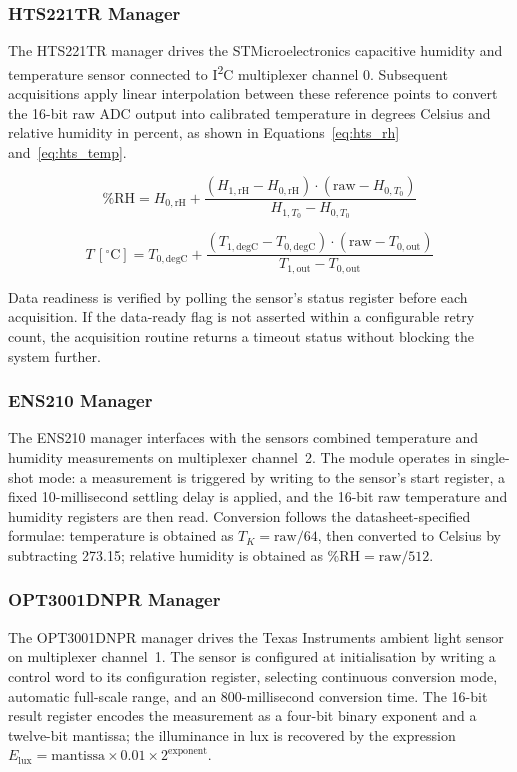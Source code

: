 \subsubsection{HTS221TR Manager}
The HTS221TR manager drives the STMicroelectronics capacitive humidity and
temperature sensor connected to I\textsuperscript{2}C multiplexer channel 0.  Subsequent acquisitions apply linear interpolation between
these reference points to convert the 16-bit raw ADC output into calibrated
temperature in degrees Celsius and relative humidity in percent, as shown in
Equations~\ref{eq:hts_rh} and~\ref{eq:hts_temp}.

\begin{equation}
\label{eq:hts_rh}
\%\mathrm{RH} = H_{0,\mathrm{rH}} +
\frac{(H_{1,\mathrm{rH}} - H_{0,\mathrm{rH}}) \cdot (\mathrm{raw} - H_{0,T_{0}})}
     {H_{1,T_{0}} - H_{0,T_{0}}}
\end{equation}

\begin{equation}
\label{eq:hts_temp}
T\,[^\circ\mathrm{C}] = T_{0,\mathrm{degC}} +
\frac{(T_{1,\mathrm{degC}} - T_{0,\mathrm{degC}}) \cdot (\mathrm{raw} - T_{0,\mathrm{out}})}
     {T_{1,\mathrm{out}} - T_{0,\mathrm{out}}}
\end{equation}

Data readiness is verified by polling the sensor's status register before each
acquisition. If the data-ready flag is not asserted within a configurable retry
count, the acquisition routine returns a timeout status without blocking the
system further.

\subsubsection{ENS210 Manager}
The ENS210 manager interfaces with the sensors combined temperature and
humidity measurements on multiplexer channel~2. The module operates in single-shot
mode: a measurement is triggered by writing to the sensor's start register, a
fixed 10-millisecond settling delay is applied, and the 16-bit raw temperature
and humidity registers are then read. Conversion follows the datasheet-specified
formulae: temperature is obtained as $T_K = \mathrm{raw}/64$, then converted to
Celsius by subtracting 273.15; relative humidity is obtained as
$\%\mathrm{RH} = \mathrm{raw}/512$.

\subsubsection{OPT3001DNPR Manager}
The OPT3001DNPR manager drives the Texas Instruments ambient light sensor on
multiplexer channel~1. The sensor is configured at initialisation by writing a
control word to its configuration register, selecting continuous conversion mode,
automatic full-scale range, and an 800-millisecond conversion time. The 16-bit
result register encodes the measurement as a four-bit binary exponent and a
twelve-bit mantissa; the illuminance in lux is recovered by the expression
$E_{\mathrm{lux}} = \mathrm{mantissa} \times 0.01 \times 2^{\mathrm{exponent}}$.

